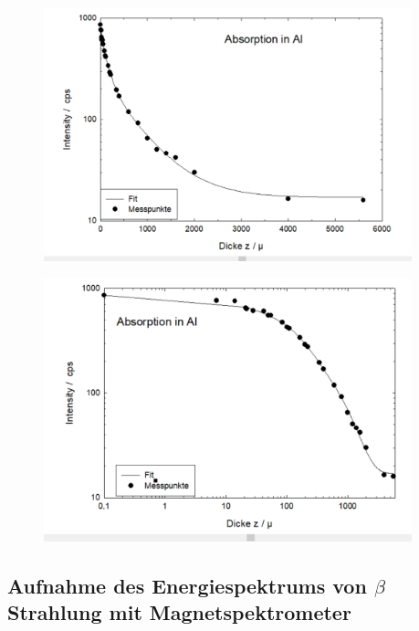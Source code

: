 \documentclass[12pt,english,ngerman]{scrartcl}
\begin{document}
\begin{figure}[H]
  \begin{center}
    \includegraphics[width = 0.95\textwidth]{figures/aluminiumabsorbtion.png}
  \end{center}
  \caption[Absorptionskurve von  bei $\beta$-Strahlung]{}
  \label{fig:alu_absorption}
\end{figure}

\begin{figure}[H]
  \begin{center}
    \includegraphics[width = 0.95\textwidth]{figures/aluminiumdoppellog.png}
  \end{center}
  \caption[Doppelt-logarithmsche Darstellung der Absorptionskurve von  bei $beta$-Strahlung]{}
  \label{fig:alu_doppellog}
\end{figure}


\subsection{Aufnahme des Energiespektrums von \texorpdfstring{$\beta$}{beta}
Strahlung mit Magnetspektrometer}
\end{document}

